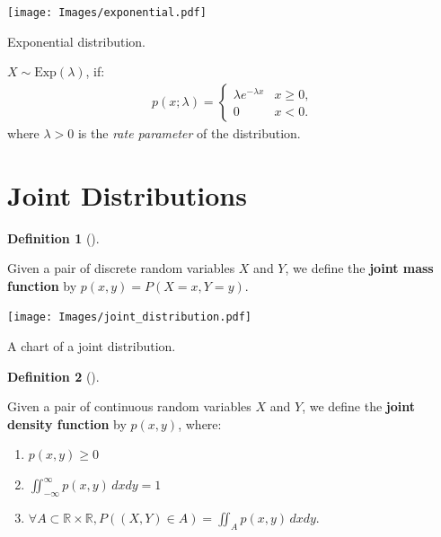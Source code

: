 \documentclass[
  letterpaper,
  12pt,
  british]{tufte-book}
\theoremstyle{plain}
\theoremstyle{plain}
\theoremstyle{definition}
\newtheorem{definition}{Definition}[chapter]
\theoremstyle{remark}
\begin{document}
\begin{marginfigure}

{\centering \texttt{[image: Images/exponential.pdf]}

}

\caption{\label{fig-exponential_distribution}Exponential distribution.}

\end{marginfigure}

\(\mathit{X}\sim \text{Exp}(\lambda)\), if: \begin{align}
    p(\mathit{x};\lambda) =
    \begin{cases}
        \lambda e^{-\lambda \mathit{x}} & \mathit{x}\ge 0, \\
        0 & \mathit{x}< 0.
    \end{cases}
\end{align} where \(\lambda > 0\) is the \emph{rate parameter} of the
distribution.

\hypertarget{joint-distributions}{%
\section{Joint Distributions}\label{joint-distributions}}

\leavevmode{}%
\begin{definition}[]\label{def-joint_mass_distribution}

Given a pair of discrete random variables \(\mathit{X}\) and
\(\mathit{Y}\), we define the \textbf{joint mass function} by
\(p(\mathit{x}, \mathit{y})=P(\mathit{X}=\mathit{x},\mathit{Y}=\mathit{y})\).

\end{definition}

\begin{marginfigure}

{\centering \texttt{[image: Images/joint\_distribution.pdf]}

}

\caption{\label{fig-joint_distribution}A chart of a joint distribution.}

\end{marginfigure}

\leavevmode{}%
\begin{definition}[]\label{def-joint_density_distribution}

Given a pair of continuous random variables \(\mathit{X}\) and
\(\mathit{Y}\), we define the \textbf{joint density function} by
\(p(\mathit{x}, \mathit{y})\), where:

\begin{enumerate}
\def\labelenumi{\roman{enumi}.}
\item
  \(p(\mathit{x}, \mathit{y}) \geq 0\)
\item
  \(\iint_{-\infty}^{\infty} p(\mathit{x},\mathit{y}) \, d\mathit{x}d\mathit{y}=1\)
\item
  \(\forall A \subset \mathbb{R}\times \mathbb{R}, P((\mathit{X},\mathit{Y})\in A)=\iint_{A}p(\mathit{x},\mathit{y})\, d\mathit{x}d\mathit{y}\).
\end{enumerate}

\end{definition}
\end{document}
